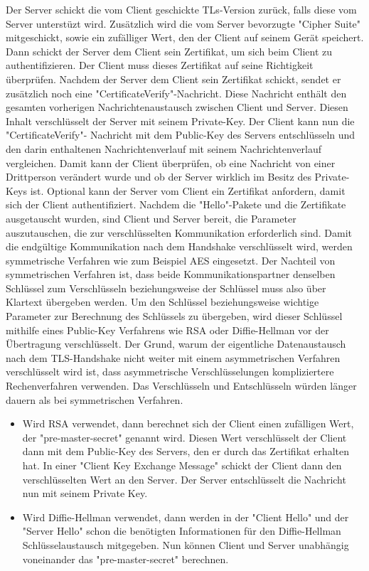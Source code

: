 Der Server schickt die vom Client geschickte TLs-Version zurück, falls diese vom Server unterstüzt wird. Zusätzlich wird die vom Server bevorzugte "Cipher Suite" mitgeschickt, sowie ein zufälliger Wert, den der Client auf seinem Gerät speichert. Dann schickt der Server dem Client sein Zertifikat, um sich beim Client zu authentifizieren. Der Client muss dieses Zertifikat auf seine Richtigkeit überprüfen. Nachdem der Server dem Client sein Zertifikat schickt, sendet er zusätzlich noch eine "CertificateVerify"-Nachricht. Diese Nachricht enthält den gesamten vorherigen Nachrichtenaustausch zwischen Client und Server. Diesen Inhalt verschlüsselt der Server mit seinem Private-Key. Der Client kann nun die "CertificateVerify"- Nachricht mit dem Public-Key des Servers entschlüsseln und den darin enthaltenen Nachrichtenverlauf mit seinem Nachrichtenverlauf vergleichen. Damit kann der Client überprüfen, ob eine Nachricht von einer Drittperson verändert wurde und ob der Server wirklich im Besitz des Private-Keys ist. Optional kann der Server vom Client ein Zertifikat anfordern, damit sich der Client authentifiziert. 
Nachdem die "Hello"-Pakete und die Zertifikate ausgetauscht wurden, sind Client und Server bereit, die Parameter auszutauschen, die zur verschlüsselten Kommunikation erforderlich sind. Damit die endgültige Kommunikation nach dem Handshake verschlüsselt wird, werden symmetrische Verfahren wie zum Beispiel AES eingesetzt. Der Nachteil von symmetrischen Verfahren ist, dass beide Kommunikationspartner denselben Schlüssel zum Verschlüsseln beziehungsweise der Schlüssel muss also über Klartext übergeben werden. Um den Schlüssel beziehungsweise wichtige Parameter zur Berechnung des Schlüssels zu übergeben, wird dieser Schlüssel mithilfe eines Public-Key Verfahrens wie RSA oder Diffie-Hellman vor der Übertragung verschlüsselt. Der Grund, warum der eigentliche Datenaustausch nach dem TLS-Handshake nicht weiter mit einem asymmetrischen Verfahren verschlüsselt wird ist, dass asymmetrische Verschlüsselungen kompliziertere Rechenverfahren verwenden. Das Verschlüsseln und Entschlüsseln würden länger dauern als bei symmetrischen Verfahren. \cite{WikiTLS}

\begin{itemize}
    \item Wird RSA verwendet, dann berechnet sich der Client einen zufälligen Wert, der "pre-master-secret" genannt wird. Diesen Wert verschlüsselt der Client dann mit dem Public-Key des Servers, den er durch das Zertifikat erhalten hat. In einer "Client Key Exchange Message" schickt der Client dann den verschlüsselten Wert an den Server. Der Server entschlüsselt die Nachricht nun mit seinem Private Key.
    \item Wird Diffie-Hellman verwendet, dann werden in der "Client Hello" und der "Server Hello" schon die benötigten Informationen für den Diffie-Hellman Schlüsselaustausch mitgegeben. Nun können Client und Server unabhängig voneinander das "pre-master-secret" berechnen.
\end{itemize}

